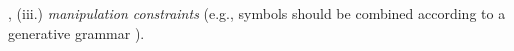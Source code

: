 , (iii.) \textit{manipulation constraints} (e.g., symbols should be combined according to a generative grammar%
).


